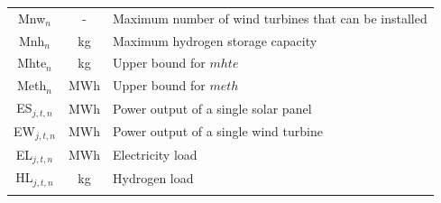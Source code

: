\begin{table}
\begin{tabularx}{\textwidth}{ccl}
    Mnw$_n$ & - & Maximum number of wind turbines that can be installed \\ 
    Mnh$_n$ & kg & Maximum hydrogen storage capacity \\
    Mhte$_n$ & kg & Upper bound for \textcolor{Cerulean}{\(mhte\)} \\ 
    Meth$_n$ & MWh & Upper bound for \(meth\) \\
  \noalign{\smallskip}\hline\noalign{\smallskip}
    ES$_{j,t,n}$ & MWh & Power output of a single solar panel\\
    EW$_{j,t,n}$ & MWh & Power output of a single wind turbine \\
    EL$_{j,t,n}$ & MWh & Electricity load \\
    HL$_{j,t,n}$ & kg & Hydrogen load\\
    \noalign{\smallskip}\hline
\end{tabularx}
\end{table}



